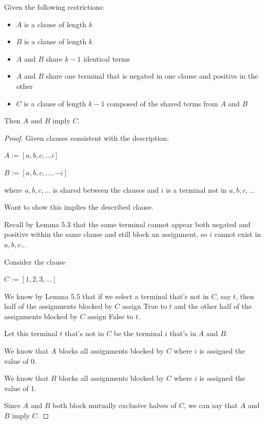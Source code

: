 \documentclass[manuscript]{acmart}
\begin{document}
    \begin{lemma}
        Given the following restrictions:
        \begin{itemize}
            \item $A$ is a clause of length $k$
            \item $B$ is a clause of length $k$
            \item $A$ and $B$ share $k-1$ identical terms
            \item $A$ and $B$ share one terminal that is negated in one clause
            and positive in the other
            \item $C$ is a clause of length $k-1$ composed of the shared terms
            from $A$ and $B$
        \end{itemize}
        Then $A$ and $B$ imply $C$.

    \end{lemma}
    \begin{proof}
        Given clauses consistent with the description:

        $A := [a, b, c, ... i]$

        $B := [a, b, c, ..., -i]$

        where $a, b, c, ...$ is shared between the clauses and $i$ is a 
        terminal not in $a, b, c, ...$

        Want to show this implies the described clause.

        Recall by Lemma 5.3 that the same terminal cannot appear both negated and
        positive within the same
        clause and still block an assignment, so $i$ cannot exist in $a, b, c...$

        Consider the clause

        $C := [1, 2, 3, ...]$

        We know by Lemma 5.5 that if we select a terminal that's not in $C$, say $t$, 
        then half of the assignments blocked by $C$ assign True to $t$ and the other
        half of the assignments blocked by $C$ assign False to $t$.

        Let this terminal $t$ that's not in $C$ be the terminal $i$ that's in $A$ and $B$.

        We know that $A$ blocks all assignments blocked by $C$ where $i$ is assigned
        the value of 0.

        We know that $B$ blocks all assignments blocked by $C$ where $i$ is assigned
        the value of 1.

        Since $A$ and $B$ both block mutually exclusive halves of $C$, we can
        say that $A$ and $B$ imply $C$.
    \end{proof}
\end{document}
